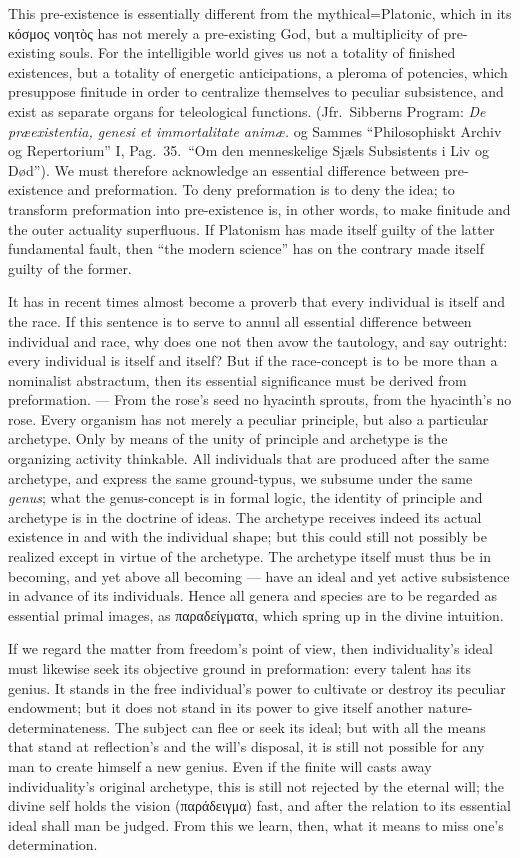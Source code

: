 \documentclass[12pt]{book}
\begin{document}
This pre-existence is essentially different from the mythical=Platonic,
which in its κόσμος νοητὸς has not merely a pre-existing God, but a
multiplicity of pre-existing souls. For the intelligible world gives us not
a totality of finished existences, but a totality of energetic
anticipations, a pleroma of potencies, which presuppose finitude in order to
centralize themselves to peculiar subsistence, and exist as separate organs
for teleological functions. (Jfr.\ Sibberns Program: \textit{De
præexistentia, genesi et immortalitate animæ.} og Sammes ``Philosophiskt
Archiv og Repertorium'' I, Pag.\ 35.\ ``Om den menneskelige Sjæls
Subsistents i Liv og Død''). We must therefore acknowledge an essential
difference between pre-existence and preformation. To deny preformation is
to deny the idea; to transform preformation into pre-existence is, in other
words, to make finitude and the outer actuality superfluous. If Platonism
has made itself guilty of the latter fundamental fault, then ``the modern
science'' has on the contrary made itself guilty of the former.

It has in recent times almost become a proverb that every individual is
itself and the race. If this sentence is to serve to annul all essential
difference between individual and race, why does one not then avow the
tautology, and say outright: every individual is itself and itself? But if
the race-concept is to be more than a nominalist abstractum, then its
essential significance must be derived from preformation. --- From the
rose's seed no hyacinth sprouts, from the hyacinth's no rose. Every organism
has not merely a peculiar principle, but also a particular archetype. Only
by means of the unity of principle and archetype is the organizing activity
thinkable. All individuals that are produced after the same archetype, and
express the same ground-typus, we subsume under the same \textit{genus};
what the genus-concept is in formal logic, the identity of principle and
archetype is in the doctrine of ideas. The archetype receives indeed its
actual existence in and with the individual shape; but this could still not
possibly be realized except in virtue of the archetype. The archetype itself
must thus be in becoming, and yet above all becoming --- have an ideal and
yet active subsistence in advance of its individuals. Hence all genera and
species are to be regarded as essential primal images, as παραδείγματα,
which spring up in the divine intuition.

If we regard the matter from freedom's point of view, then individuality's
ideal must likewise seek its objective ground in preformation: every talent
has its genius. It stands in the free individual's power to cultivate or
destroy its peculiar endowment; but it does not stand in its power to give
itself another nature-determinateness. The subject can flee or seek its
ideal; but with all the means that stand at reflection's and the will's
disposal, it is still not possible for any man to create himself a new
genius. Even if the finite will casts away individuality's original
archetype, this is still not rejected by the eternal will; the divine self
holds the vision (παράδειγμα) fast, and after the relation to its essential
ideal shall man be judged. From this we learn, then, what it means to miss
one's determination.
\end{document}
